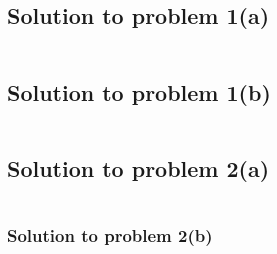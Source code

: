 \documentclass[12pt,answers,addpoints]{exam}
\begin{document}
\subsection{Solution to problem 1(a)}
\scriptsize
\inputminted{python}{./sol1_a.py}

\subsection{Solution to problem 1(b)}
\scriptsize
\inputminted{python}{./sol1_b.py}

\subsection{Solution to problem 2(a)}
\scriptsize
\inputminted{python}{./sol2_a.py}

\subsubsection{Solution to problem 2(b)}
\scriptsize
\inputminted{python}{./sol2_b.py}
\end{document}
